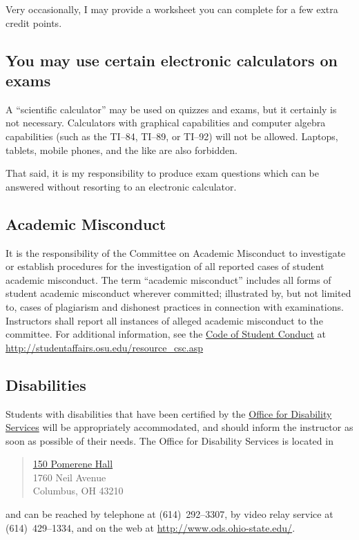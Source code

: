 \documentclass[12pt]{handout}
\begin{document}
\noindent Very occasionally, I may provide a worksheet you can complete for a few extra credit points.

\subsection*{You may use certain electronic calculators on exams}

A ``scientific calculator'' may be used on quizzes and exams, but it
certainly is not necessary.  Calculators with graphical capabilities
and computer algebra capabilities (such as the TI--84, TI--89, or
TI--92) will not be allowed.  Laptops, tablets, mobile phones, and the
like are also forbidden.

That said, it is my responsibility to produce exam questions which can
be answered without resorting to an electronic calculator.

\subsection*{Academic Misconduct}

It is the responsibility of the Committee on Academic Misconduct to
investigate or establish procedures for the investigation of all
reported cases of student academic misconduct. The term ``academic
misconduct'' includes all forms of student academic misconduct
wherever committed; illustrated by, but not limited to, cases of
plagiarism and dishonest practices in connection with
examinations. Instructors shall report all instances of alleged
academic misconduct to the committee. For additional information, see
the \href{http://studentaffairs.osu.edu/resource_csc.asp}{Code of Student
 Conduct} at \url{http://studentaffairs.osu.edu/resource_csc.asp}

\subsection*{Disabilities}

Students with disabilities that have been certified by the
\href{http://www.ods.ohio-state.edu}{Office for Disability Services}
will be appropriately accommodated, and should inform the instructor
as soon as possible of their needs. The Office for Disability Services
is located in 
\begin{quote}
\href{http://www.osu.edu/map/building.php?building=067}{150 Pomerene Hall}\\
1760 Neil Avenue\\
Columbus, OH\hspace{0.5em} 43210
\end{quote}
and can be reached by telephone at (614)~292--3307, by video relay
service at (614)~429--1334, and on the web at
\url{http://www.ods.ohio-state.edu/}.
\end{document}
